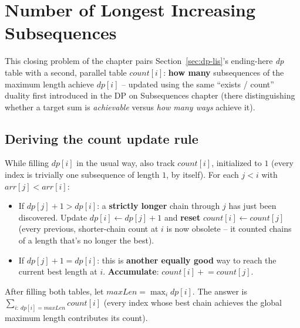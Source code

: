 \section{Number of Longest Increasing Subsequences}
\label{sec:dp-number-of-lis}


\begin{patternbox}
This closing problem of the chapter pairs Section~\ref{sec:dp-lis}'s
ending-here \textit{dp} table with a second, parallel table
$\textit{count}[i]$: \textbf{how many} subsequences of the maximum
length achieve $\textit{dp}[i]$ -- updated using the same
``exists / count'' duality first introduced in the DP on Subsequences
chapter (there distinguishing whether a target sum is
\emph{achievable} versus \emph{how many ways} achieve it).
\end{patternbox}

\subsection*{Deriving the count update rule}

While filling $\textit{dp}[i]$ in the usual way, also track
$\textit{count}[i]$, initialized to $1$ (every index is trivially one
subsequence of length $1$, by itself). For each $j<i$ with
$\textit{arr}[j]<\textit{arr}[i]$:
\begin{itemize}
  \item If $\textit{dp}[j]+1 > \textit{dp}[i]$: a \textbf{strictly
        longer} chain through $j$ has just been discovered. Update
        $\textit{dp}[i] \gets \textit{dp}[j]+1$ and \textbf{reset}
        $\textit{count}[i] \gets \textit{count}[j]$ (every previous,
        shorter-chain count at $i$ is now obsolete -- it counted chains
        of a length that's no longer the best).
  \item If $\textit{dp}[j]+1 = \textit{dp}[i]$: this is \textbf{another
        equally good} way to reach the current best length at $i$.
        \textbf{Accumulate}: $\textit{count}[i] \mathrel{+}=
        \textit{count}[j]$.
\end{itemize}
After filling both tables, let $\textit{maxLen} = \max_i \textit{dp}[i]$.
The answer is $\sum_{i:\ \textit{dp}[i]=\textit{maxLen}}
\textit{count}[i]$ (every index whose best chain achieves the global
maximum length contributes its count).

